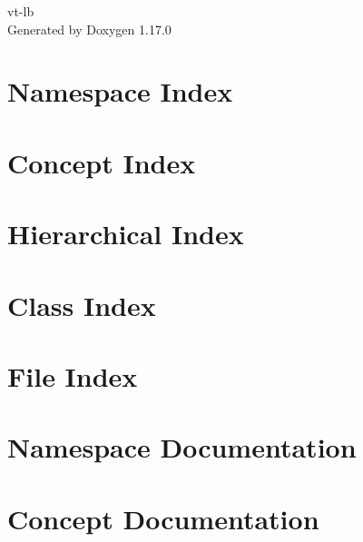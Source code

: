 \documentclass[twoside]{book}
\newcommand{\+}{\discretionary{\mbox{\scriptsize$\hookleftarrow$}}{}{}}
\newcommand{\clearemptydoublepage}{%
    \newpage{\pagestyle{empty}\cleardoublepage}%
  }
\begin{document}
  \raggedbottom
    \hypersetup{pageanchor=false,
                bookmarksnumbered=true,
                pdfencoding=unicode
               }
  \begin{titlepage}
  \vspace*{7cm}
  \begin{center}%
  {\Large vt-\/lb}\\
  \vspace*{1cm}
  {\large Generated by Doxygen 1.17.0}\\
  \end{center}
  \end{titlepage}
  \clearemptydoublepage
  \tableofcontents
  \clearemptydoublepage
  \hypersetup{pageanchor=true}

\chapter{Namespace Index}

\chapter{Concept Index}

\chapter{Hierarchical Index}

\chapter{Class Index}

\chapter{File Index}

\chapter{Namespace Documentation}

\chapter{Concept Documentation}








\end{document}

